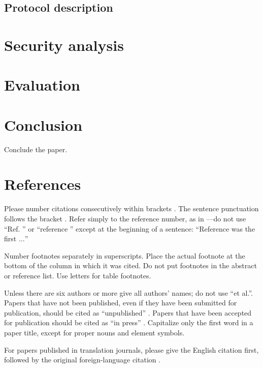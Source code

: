\documentclass[conference]{IEEEtran}
\begin{document}
\subsection{Protocol description}

\section{Security analysis}

\section{Evaluation}

\section{Conclusion}
Conclude the paper.

\section*{References}

Please number citations consecutively within brackets \cite{b1}. The 
sentence punctuation follows the bracket \cite{b2}. Refer simply to the reference 
number, as in \cite{b3}---do not use ``Ref. \cite{b3}'' or ``reference \cite{b3}'' except at 
the beginning of a sentence: ``Reference \cite{b3} was the first $\ldots$''

Number footnotes separately in superscripts. Place the actual footnote at 
the bottom of the column in which it was cited. Do not put footnotes in the 
abstract or reference list. Use letters for table footnotes.

Unless there are six authors or more give all authors' names; do not use 
``et al.''. Papers that have not been published, even if they have been 
submitted for publication, should be cited as ``unpublished'' \cite{b4}. Papers 
that have been accepted for publication should be cited as ``in press'' \cite{b5}. 
Capitalize only the first word in a paper title, except for proper nouns and 
element symbols.

For papers published in translation journals, please give the English 
citation first, followed by the original foreign-language citation \cite{b6}.
\end{document}
